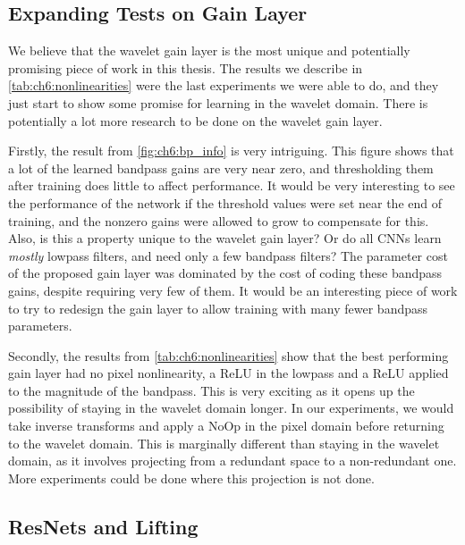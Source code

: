 \subsection{Expanding Tests on Gain Layer}
We believe that the wavelet gain layer is the most unique and potentially promising
piece of work in this thesis. The results we describe in \autoref{tab:ch6:nonlinearities} 
were the last experiments we were able to do, and they just start to show some
promise for learning in the wavelet domain. There is potentially a lot more
research to be done on the wavelet gain layer.

Firstly, the result from \autoref{fig:ch6:bp_info} is very intriguing. This
figure shows that a lot of the learned bandpass gains are very near zero,
and thresholding them after training does little to affect performance. It would
be very interesting to see the performance of the network if the threshold
values were set near the end of training, and the nonzero gains were allowed to
grow to compensate for this. Also, is this a property unique to the wavelet gain
layer? Or do all CNNs learn \emph{mostly} lowpass filters, and need only a few
bandpass filters? The parameter cost of the proposed gain layer was dominated
by the cost of coding these bandpass gains, despite requiring very few of them.
It would be an interesting piece of work to try to redesign the gain layer to
allow training with many fewer bandpass parameters.

Secondly, the results from \autoref{tab:ch6:nonlinearities} show that the best
performing gain layer had no pixel nonlinearity, a ReLU in the lowpass and 
a ReLU applied to the magnitude of the bandpass. This is very exciting as it
opens up the possibility of staying in the wavelet domain longer. In our
experiments, we would take inverse transforms and apply a NoOp in the pixel
domain before returning to the wavelet domain. This is marginally different
than staying in the wavelet domain, as it involves projecting from a redundant
space to a non-redundant one. More experiments could be done where this
projection is not done.

\subsection{ResNets and Lifting}
\begin{figure}
  \centering
  \qquad
  \label{fig:ch7:lifting_resnet}
\end{figure}

